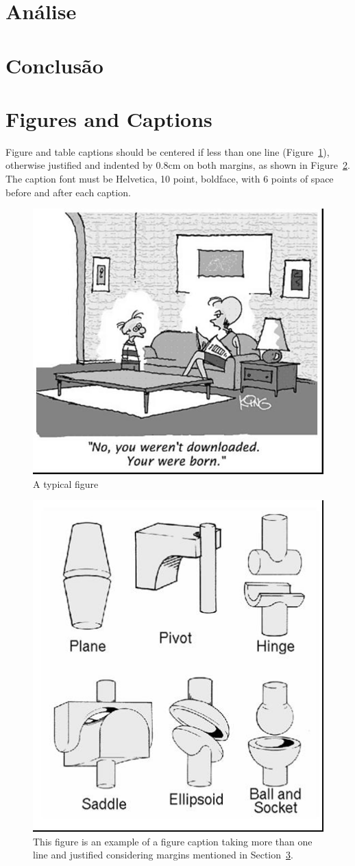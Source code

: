 \documentclass[12pt]{article}
\begin{document}
\section{Análise}
\section{Conclusão}

\section{Figures and Captions}\label{sec:figs}


Figure and table captions should be centered if less than one line
(Figure~\ref{fig:exampleFig1}), otherwise justified and indented by 0.8cm on
both margins, as shown in Figure~\ref{fig:exampleFig2}. The caption font must
be Helvetica, 10 point, boldface, with 6 points of space before and after each
caption.

\begin{figure}[ht]
\centering
\includegraphics[width=.5\textwidth]{fig1.jpg}
\caption{A typical figure}
\label{fig:exampleFig1}
\end{figure}

\begin{figure}[ht]
\centering
\includegraphics[width=.3\textwidth]{fig2.jpg}
\caption{This figure is an example of a figure caption taking more than one
  line and justified considering margins mentioned in Section~\ref{sec:figs}.}
\label{fig:exampleFig2}
\end{figure}
\end{document}
